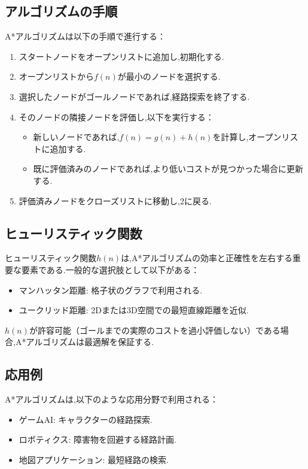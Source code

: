 \subsection*{アルゴリズムの手順}
A*アルゴリズムは以下の手順で進行する：
\begin{enumerate}
    \item スタートノードをオープンリストに追加し,初期化する.
    \item オープンリストから$f(n)$が最小のノードを選択する.
    \item 選択したノードがゴールノードであれば,経路探索を終了する.
    \item そのノードの隣接ノードを評価し,以下を実行する：
    \begin{itemize}
        \item 新しいノードであれば,$f(n) = g(n) + h(n)$を計算し,オープンリストに追加する.
        \item 既に評価済みのノードであれば,より低いコストが見つかった場合に更新する.
    \end{itemize}
    \item 評価済みノードをクローズリストに移動し,2に戻る.
\end{enumerate}

\subsection*{ヒューリスティック関数}
ヒューリスティック関数$h(n)$は,A*アルゴリズムの効率と正確性を左右する重要な要素である.一般的な選択肢として以下がある：
\begin{itemize}
    \item マンハッタン距離: 格子状のグラフで利用される.
    \item ユークリッド距離: 2Dまたは3D空間での最短直線距離を近似.
\end{itemize}
$h(n)$が許容可能（ゴールまでの実際のコストを過小評価しない）である場合,A*アルゴリズムは最適解を保証する.

\subsection*{応用例}
A*アルゴリズムは,以下のような応用分野で利用される：
\begin{itemize}
    \item ゲームAI: キャラクターの経路探索.
    \item ロボティクス: 障害物を回避する経路計画.
    \item 地図アプリケーション: 最短経路の検索.
\end{itemize}

